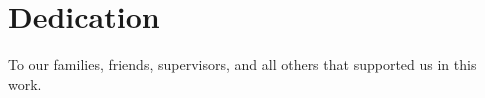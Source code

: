 \chapter*{Dedication}

\begin{center}
	\vspace{100mm}
	To our families, friends, supervisors, and all others that supported us in this work. \\
\end{center}

